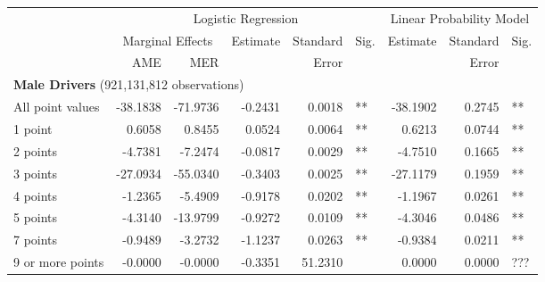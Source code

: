 
\begin{table}%
\centering 
\begin{tabular}{l r r r r l r r l} 

\hline 
 
 & \multicolumn{5}{c}{Logistic Regression}  & \multicolumn{3}{c}{Linear Probability Model} \\ 

 \cmidrule(lr){2-6}\cmidrule(lr){7-9} 
 & \multicolumn{2}{c}{Marginal Effects} & Estimate & Standard & Sig. & Estimate & Standard & Sig. \\ 

 \cmidrule(lr){2-3} 
 &   AME & MER &          &  Error   &      &          &  Error   &     \\ 

\hline 
 
\multicolumn{8}{l}{\textbf{Male Drivers} (921,131,812 observations)} \\ 

All point values                &  -38.1838        &  -71.9736       &  -0.2431        &  0.0018       &   **       &  -38.1902        &  0.2745       &   **       \\ 
1 point                         &  0.6058        &  0.8455       &  0.0524        &  0.0064       &   **       &  0.6213        &  0.0744       &   **       \\ 
2 points                        &  -4.7381        &  -7.2474       &  -0.0817        &  0.0029       &   **       &  -4.7510        &  0.1665       &   **       \\ 
3 points                        &  -27.0934        &  -55.0340       &  -0.3403        &  0.0025       &   **       &  -27.1179        &  0.1959       &   **       \\ 
4 points                        &  -1.2365        &  -5.4909       &  -0.9178        &  0.0202       &   **       &  -1.1967        &  0.0261       &   **       \\ 
5 points                        &  -4.3140        &  -13.9799       &  -0.9272        &  0.0109       &   **       &  -4.3046        &  0.0486       &   **       \\ 
7 points                        &  -0.9489        &  -3.2732       &  -1.1237        &  0.0263       &   **       &  -0.9384        &  0.0211       &   **       \\ 
9 or more points                &  -0.0000        &  -0.0000       &  -0.3351        &  51.2310       &            &  0.0000        &  0.0000       &  ???       \\ 


\end{tabular}
\end{table}
